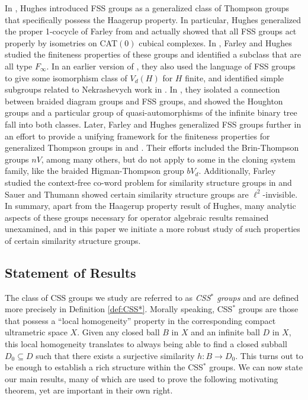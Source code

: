 \documentclass[12pt]{amsart}
\numberwithin{equation}{subsection}
\theoremstyle{definition}
\theoremstyle{definition}
\theoremstyle{remark}
\begin{document}
In \cite{hughes2009}, Hughes introduced FSS groups as a generalized class of Thompson groups that specifically possess the Haagerup property. In particular, Hughes generalized the proper 1-cocycle of Farley from \cite{farley2003proper} and actually showed that all FSS groups act properly by isometries on CAT$(0)$ cubical complexes. In \cite{FarleyHughes15}, Farley and Hughes studied the finiteness properties of these groups and identified a subclass that are all type $F_\infty$. In an earlier version of \cite{FarleyHughes15}, they also used the language of FSS groups to give some isomorphism class of $V_d(H)$ for $H$ finite, and identified simple subgroups related to Nekrashevych work in \cite{nekrashevych2004cuntz}. In \cite{hughes2017braided}, they isolated a connection between braided diagram groups and FSS groups, and showed the Houghton groups and a particular group of quasi-automorphisms of the infinite binary tree fall into both classes. Later, Farley and Hughes generalized FSS groups further in an effort to provide a unifying framework for the finiteness properties for generalized Thompson groups in \cite{FarleyHugheslocalgroups} and \cite{Farley25Expansion}. Their efforts included the Brin-Thompson groups $nV$, among many others, but do not apply to some in the cloning system family, like the braided Higman-Thompson group $bV_d$. Additionally, Farley studied the context-free co-word problem for similarity structure groups in \cite{Farley18ContextFree} and Sauer and Thumann \cite{SauerThumann2014} showed certain similarity structure groups are $\ell^2$-invisible. In summary, apart from the Haagerup property result of Hughes, many analytic aspects of these groups necessary for operator algebraic results remained unexamined, and in this paper we initiate a more robust study of such properties of certain similarity structure groups.


\subsection*{Statement of Results}

The class of CSS groups we study are referred to as \emph{CSS$^*$ groups} and are defined more precisely in Definition \ref{def:CSS*}. Morally speaking, CSS$^*$ groups are those that possess a ``local homogeneity'' property in the corresponding compact ultrametric space $X$. Given any closed ball $B$ in $X$ and an infinite ball $D$ in $X$, this local homogeneity translates to always being able to find a closed subball  $D_0 \subseteq D$ such that there exists a surjective similarity $h:B \to D_0$. This turns out to be enough to establish a rich structure within the CSS$^*$ groups. We can now state our main results, many of which are used to prove the following motivating theorem, yet are important in their own right. 
\end{document}
